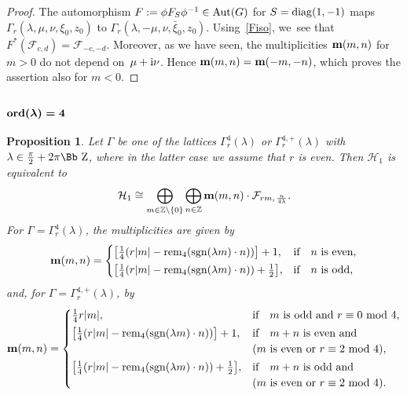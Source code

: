\documentclass[10pt,a4paper]{amsart}
\newcommand\ZZ{{\mbox{\Bb Z}}}
\newcommand\Z{{\mathbb Z}}
\newcommand\bm{\textbf{{\rm \textbf{m}}}}
\newcommand\cH{{\mathcal H}}
\newcommand\cF{{\mathcal F}}
\newcommand{\Aut}{\mathop{{\rm Aut}}}
\newcommand{\sgn}{\mathop{{\rm sgn}}}
\newcommand{\diag}{\mathop{{\rm diag}}}
\newcommand{\rem}{\mathop{{\rm rem}}}
\newcommand{\ord}{{\rm ord}}
\numberwithin{equation}{section}
\newtheorem{Proposition}[Theorem]{Proposition}
 { \theoremstyle{definition}
\newtheorem{Definition}[Theorem]{Definition}
\newtheorem{Note}[Theorem]{Note}
\newtheorem{Example}[Theorem]{Example}
\newtheorem{Remark}[Theorem]{Remark} }
\begin{document}
\begin{proof}
The automorphism $F:=\phi F_{S}\phi^{-1}\in \Aut(G)$ for $S=\diag(1,-1)$ maps $\Gamma_r(\lambda,\mu,\nu,\xi_0,z_0)$ to $\Gamma_r(\lambda,-\mu,\nu,\bar\xi_0,z_0)$. Using~\eqref{Fiso}, we~see that $F^*(\cF_{c,d})=\cF_{-c,-d}$. Moreover, as we have seen, the multiplicities $\bm(m,n)$ for $m>0$ do not depend on~$\mu+{\rm i}\nu$. Hence $\bm(m,n)=\bm(-m,-n)$, which proves the assertion also for $m<0$.
\end{proof}



\subsubsection[$\ord(\lambda)=4$]{$\boldsymbol{\ord(\lambda)=4}$}

\begin{Proposition} \label{P12} Let $\Gamma$ be one of the lattices $\Gamma_r^4(\lambda)$ or $\Gamma_r^{4,+}(\lambda)$ with $\lambda\in\frac\pi2+2\pi\ZZ$, where in the latter case we assume that $r$ is even. Then $\cH_1$ is equivalent to
\begin{gather*}
\cH_1\cong\bigoplus_{m\in \Z\backslash\{0\}} \bigoplus_{n\in\Z} \bm(m,n)\cdot \cF_{rm,\,\frac n{4\lambda}}.
\end{gather*}
For $\Gamma=\Gamma_r^4(\lambda)$, the multiplicities are given by
\begin{gather*}
\bm(m,n) =\begin{cases}
\big[\frac14(r|m|-\rem_4(\sgn(\lambda m)\cdot n))\big]+1,& \text{if\quad $n$ is even},
\\[.5ex]
\big[\frac14(r|m|-\rem_4(\sgn(\lambda m)\cdot n))+\frac12\big],& \text{if\quad $n$ is odd},
\end{cases}
\end{gather*}
and, for $\Gamma=\Gamma_r^{4,+}(\lambda)$, by
\begin{gather*}
\bm(m,n) =\begin{cases}
\frac14 r|m|,& \text{if\quad $m$ is odd and $r\equiv 0\ {\rm mod}\ 4$},
\\[.5ex]
\big[\frac14(r|m|-\rem_4(\sgn(\lambda m)\cdot n))\big]+1,& \text{if\quad $m+n$ is even and}
\\
& (m \mbox{ is even or } r\equiv 2\ {\rm mod}\ 4),
\\[.5ex]
\big[\frac14(r|m|-\rem_4(\sgn(\lambda m)\cdot n))+\frac12\big],& \text{if\quad $m+n$ is odd and}
\\
& (m \mbox{ is even or } r\equiv 2\ {\rm mod}\ 4).
\end{cases}
\end{gather*}
\end{Proposition}
\end{document}
